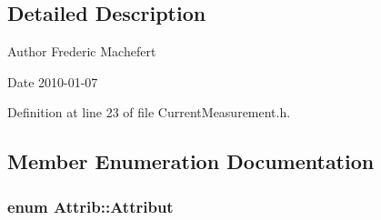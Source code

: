 \subsection{Detailed Description}
\begin{DoxyAuthor}{Author}
Frederic Machefert 
\end{DoxyAuthor}
\begin{DoxyDate}{Date}
2010-\/01-\/07 
\end{DoxyDate}


Definition at line 23 of file CurrentMeasurement.h.

\subsection{Member Enumeration Documentation}
\hypertarget{classAttrib_a69e171d7cc6417835a5a306d3c764235}{
\subsubsection[{Attribut}]{\setlength{\rightskip}{0pt plus 5cm}enum {\bf Attrib::Attribut}}}
\label{classAttrib_a69e171d7cc6417835a5a306d3c764235}
